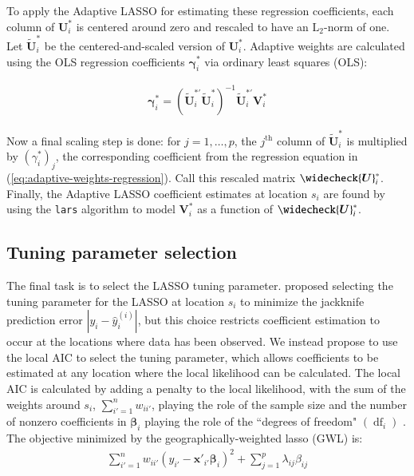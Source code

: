 \documentclass[authoryear, review, 11pt]{elsarticle}
\DeclareMathOperator*{\df}{\mbox{df}}
\begin{document}
	To apply the Adaptive LASSO for estimating these regression coefficients, each column of $\bm{U}_i^*$ is centered around zero and rescaled to have an $\mbox{L}_2$-norm of one. Let $\widetilde{\bm{U}}_i^*$ be the centered-and-scaled version of $\bm{U}_i^*$. Adaptive weights are calculated using the OLS regression coefficients $\bm{\gamma}_i^*$ via ordinary least squares (OLS):
	
	\begin{eqnarray}\label{eq:adaptive-weights-regression}
		\bm{\gamma}_i^* = \left( \widetilde{\bm{U}}_i^{*'} \widetilde{\bm{U}}_i^* \right)^{-1} \widetilde{\bm{U}}_i^{*'} \bm{V}_i^*
	\end{eqnarray}
	
	Now a final scaling step is done: for $j=1, \dots, p$, the $j^{\mbox{th}}$ column of $\tilde{\bm{U}}_i^*$ is multiplied by $\left(\gamma_i^*\right)_j$, the corresponding coefficient from the regression equation in (\ref{eq:adaptive-weights-regression}). Call this rescaled matrix $\widecheck{\bm{U}}_i^*$.\\
	
	Finally, the Adaptive LASSO coefficient estimates at location $s_i$ are found by using the \verb!lars! algorithm \citep{Efron:2004b} to model $\bm{V}_i^*$ as a function of $\widecheck{\bm{U}}_i^*$.

	\subsection{Tuning parameter selection}
	The final task is to select the LASSO tuning parameter. \cite{Wheeler:2009} proposed selecting the tuning parameter for the LASSO at location $s_i$ to minimize the jackknife prediction error $|y_i - \hat{y}_i^{(i)}|$, but this choice restricts coefficient estimation to occur at the locations where data has been observed. We instead propose to use the local AIC \citep{Akaike:1974} to select the tuning parameter, which allows coefficients to be estimated at any location where the local likelihood can be calculated. The local AIC is calculated by adding a penalty to the local likelihood, with the sum of the weights around $s_i$, $\sum_{i'=1}^n w_{ii'}$, playing the role of the sample size and the number of nonzero coefficients in $\bm{\beta}_i$ playing the role of the ``degrees of freedom" $\left( \df_i \right)$ \citep{Zou:2007}.\\
	
	The objective minimized by the geographically-weighted lasso (GWL) is:	
	\begin{eqnarray}
		\sum_{i'=1}^n w_{ii'} \left(y_{i'} - \bm{x}'_{i'} \bm{\beta}_i \right)^2 + \sum_{j=1}^p \lambda_{ij} \beta_{ij}
	\end{eqnarray}
	
\end{document}
